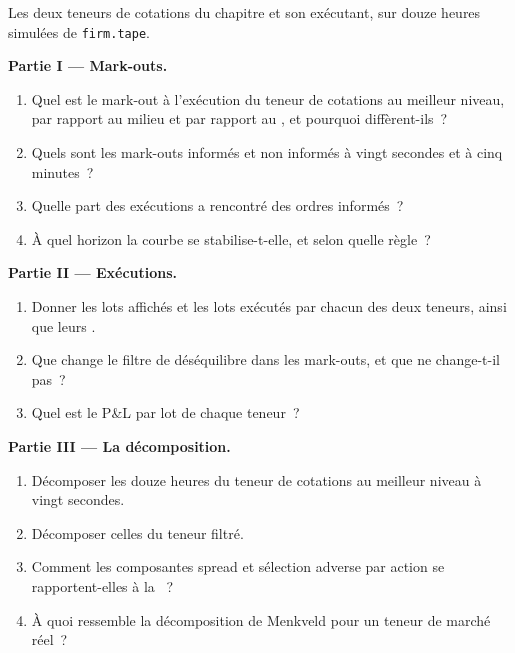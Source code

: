 \begin{problem}\label{pb:rs:measuring-market-making-and-execution:1}
Les deux teneurs de cotations du chapitre et son exécutant, sur douze heures simulées de \texttt{firm.tape}.

\medskip\noindent\textbf{Partie I --- Mark-outs.}
\begin{enumerate}
\item Quel est le mark-out à l'exécution du teneur de cotations au meilleur niveau, par rapport au milieu et par rapport au , et pourquoi diffèrent-ils~?
\item Quels sont les mark-outs informés et non informés à vingt secondes et à cinq minutes~?
\item Quelle part des exécutions a rencontré des ordres informés~?
\item À quel horizon la courbe se stabilise-t-elle, et selon quelle règle~?
\end{enumerate}

\medskip\noindent\textbf{Partie II --- Exécutions.}
\begin{enumerate}[resume]
\item Donner les lots affichés et les lots exécutés par chacun des deux teneurs, ainsi que leurs .
\item Que change le filtre de déséquilibre dans les mark-outs, et que ne change-t-il pas~?
\item Quel est le P\&L par lot de chaque teneur~?
\end{enumerate}

\medskip\noindent\textbf{Partie III --- La décomposition.}
\begin{enumerate}[resume]
\item Décomposer les douze heures du teneur de cotations au meilleur niveau à vingt secondes.
\item Décomposer celles du teneur filtré.
\item Comment les composantes spread et sélection adverse par action se rapportent-elles à la ~?
\item À quoi ressemble la décomposition de Menkveld pour un teneur de marché réel~?
\end{enumerate}


\end{problem}
